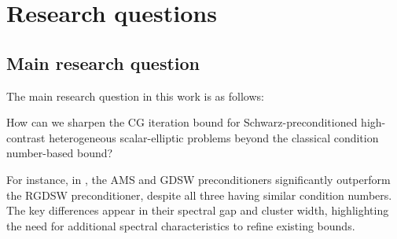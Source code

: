\chapter{Research questions}\label{ch:questions}\newpage
\section{Main research question}
The main research question in this work is as follows:
\begin{researchq} \label{rq:main}
    \par
    How can we sharpen the CG iteration bound for Schwarz-preconditioned high-contrast heterogeneous scalar-elliptic problems beyond the classical condition number-based bound?
\end{researchq}
For instance, in \cite{ams_coarse_space_comp_study_Alves2024}, the AMS and GDSW preconditioners significantly outperform the RGDSW preconditioner, despite all three having similar condition numbers. The key differences appear in their spectral gap and cluster width, highlighting the need for additional spectral characteristics to refine existing bounds.


